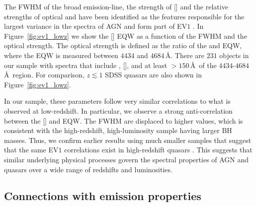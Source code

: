 The FWHM of the broad \hb emission-line, the strength of [] and the relative strengths of optical  and \hb have been identified as the features responsible for the largest variance in the spectra of AGN and form part of EV$1$ \citet{boroson92}.   
In Figure~\ref{fig:ev1_lowz} we show the [] EQW as a function of the \hb FWHM and the optical  strength. 
The optical  strength is defined as the ratio of the  and \hb EQW, where the  EQW is measured between $4434$ and $4684$\,\AA.
There are $231$ objects in our sample with spectra that include \hbns, [], and at least $>150$\,\AA\, of the $4434$-$4684$\,\AA\,  region.  
For comparison, $z\lesssim1$ SDSS quasars are also shown in Figure~\ref{fig:ev1_lowz}. 
 
In our sample, these parameters follow very similar correlations to what is observed at low-redshift.
In particular, we observe a strong anti-correlation between the [] and  EQW.  
The \hb FWHM are displaced to higher values, which is consistent with the high-redshift, high-luminosity sample having larger BH masses. 
Thus, we confirm earlier results using much smaller samples that suggest that the same EV$1$ correlations exist in high-redshift quasars \citep[e.g.][]{netzer04,sulentic04,sulentic06,runnoe13,shen16a}.
This suggests that similar underlying physical processes govern the spectral properties of AGN and quasars over a wide range of redshifts and luminosities. 

\subsection{Connections with  emission properties}
\label{sec:ch4-civtrends}

